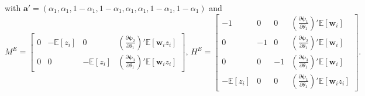 \begin{lem}
  with $\mathbf{a}' = (\alpha_1, \alpha_1, 1 - \alpha_1, 1 - \alpha_1, \alpha_1, \alpha_1, 1 - \alpha_1, 1 - \alpha_1)$ 
and 
\[
  M^E = \left[ 
    \begin{array}{cccc} 
      0 & -\mathbb{E}[z_i] & 0 & \left( \frac{\partial \boldsymbol{\psi}_2}{\partial \theta_1} \right)' \mathbb{E}[\mathbf{w}_iz_i]\\ 
      0 & 0 & -\mathbb{E}[z_i] & \left( \frac{\partial \boldsymbol{\psi}_3}{\partial \theta_1} \right)' \mathbb{E}[\mathbf{w}_iz_i] 
  \end{array} \right], \,
H^E = \left[
\begin{array}{cccc}
  -1 & 0 & 0 
  & \left(\frac{\partial \boldsymbol{\psi}_1}{\partial \theta_1}\right)'\mathbb{E}[\mathbf{w}_i]\\
   0 & -1 & 0 &  \left(\frac{\partial \boldsymbol{\psi}_2}{\partial \theta_1}\right)'\mathbb{E}[\mathbf{w}_i]\\
   0 & 0 & -1 & \left(\frac{\partial \boldsymbol{\psi}_3}{\partial \theta_1}\right)'\mathbb{E}[\mathbf{w}_i]\\
   -\mathbb{E}[z_i] & 0 & 0 &  \left(\frac{\partial \boldsymbol{\psi}_1}{\partial \theta_1}\right)'\mathbb{E}[\mathbf{w}_iz_i]
\end{array}
\right].
\]
\label{lem:prelim}
\end{lem}

